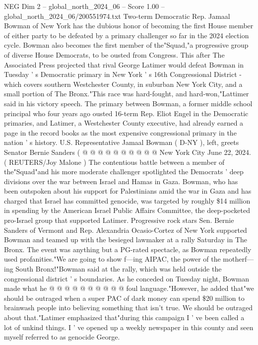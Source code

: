 \begin{textsample}{NEG Dim 2 – global\_north\_2024\_06 – Score 1.00 – global\_north\_2024\_06/200551974.txt}  \label{ex:f2_neg_128}
Two-term Democratic Rep.
Jamaal Bowman of New York has the dubious honor of becoming the first House member of either party to be defeated by a primary challenger so far in the 2024 election cycle.
Bowman also becomes the first member of the"Squad,"a progressive group of diverse House Democrats, to be ousted from Congress.
This after The Associated Press projected that rival George Latimer would defeat Bowman in Tuesday ' s Democratic primary in New York ' s 16th Congressional District - which covers southern Westchester County, in suburban New York City, and a small portion of The Bronx."This race was hard-fought, and hard-won,"Lattimer said in his victory speech.
The primary between Bowman, a former middle school principal who four years ago ousted 16-term Rep.
Eliot Engel in the Democratic primaries, and Latimer, a Westchester County executive, had already earned a page in the record books as the most expensive congressional primary in the nation ' s history.
U.S.
Representative Jamaal Bowman ( D-NY ), left, greets Senator Bernie Sanders ( @ @ @ @ @ @ @ @ @ @ New York City June 22, 2024. ( REUTERS/Joy Malone ) The contentious battle between a member of the"Squad"and his more moderate challenger spotlighted the Democrats ' deep divisions over the war between Israel and Hamas in Gaza.
Bowman, who has been outspoken about his support for Palestinians amid the war in Gaza and has charged that Israel has committed genocide, was targeted by roughly \$14 million in spending by the American Israel Public Affairs Committee, the deep-pocketed pro-Israel group that supported Latimer.
Progressive rock stars Sen.
Bernie Sanders of Vermont and Rep.
Alexandria Ocasio-Cortez of New York supported Bowman and teamed up with the besieged lawmaker at a rally Saturday in The Bronx.
The event was anything but a PG-rated spectacle, as Bowman repeatedly used profanities."We are going to show f---ing AIPAC, the power of the motherf---ing South Bronx!"Bowman said at the rally, which was held outside the congressional district ' s boundaries.
As he conceded on Tuesday night, Bowman made what he @ @ @ @ @ @ @ @ @ @ foul language."However, he added that"we should be outraged when a super PAC of dark money can spend \$20 million to brainwash people into believing something that isn't true.
We should be outraged about that."Latimer emphasized that"during this campaign I ' ve been called a lot of unkind things.
I ' ve opened up a weekly newspaper in this county and seen myself referred to as genocide George.

\end{textsample}
